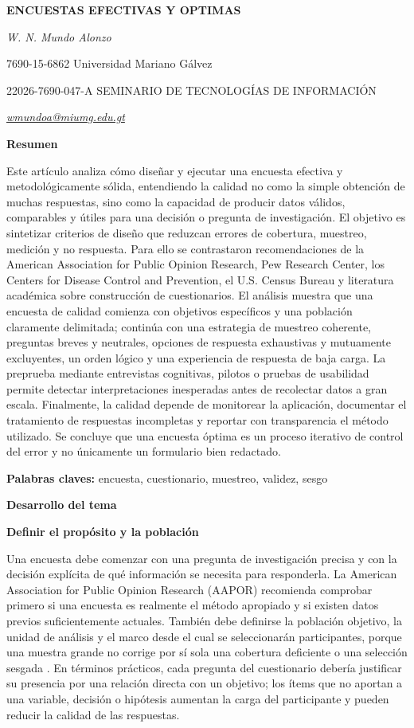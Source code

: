 \documentclass[12pt,letterpaper]{article}
\newcommand{\seccion}[1]{%
  \vspace{4pt}%
  {\noindent\textbf{#1}\par}%
  \vspace{1pt}%
}
\begin{document}
\justifying
\sloppy

\begin{center}
{\bfseries ENCUESTAS EFECTIVAS Y OPTIMAS\par}
\vspace{4pt}
{\itshape W. N. Mundo Alonzo\par}
7690-15-6862 Universidad Mariano Gálvez\par
22026-7690-047-A SEMINARIO DE TECNOLOGÍAS DE INFORMACIÓN\par
{\itshape \href{mailto:wmundoa@miumg.edu.gt}{wmundoa@miumg.edu.gt}\par}
\end{center}

\seccion{Resumen}
Este artículo analiza cómo diseñar y ejecutar una encuesta efectiva y metodológicamente sólida, entendiendo la calidad no como la simple obtención de muchas respuestas, sino como la capacidad de producir datos válidos, comparables y útiles para una decisión o pregunta de investigación. El objetivo es sintetizar criterios de diseño que reduzcan errores de cobertura, muestreo, medición y no respuesta. Para ello se contrastaron recomendaciones de la American Association for Public Opinion Research, Pew Research Center, los Centers for Disease Control and Prevention, el U.S. Census Bureau y literatura académica sobre construcción de cuestionarios. El análisis muestra que una encuesta de calidad comienza con objetivos específicos y una población claramente delimitada; continúa con una estrategia de muestreo coherente, preguntas breves y neutrales, opciones de respuesta exhaustivas y mutuamente excluyentes, un orden lógico y una experiencia de respuesta de baja carga. La preprueba mediante entrevistas cognitivas, pilotos o pruebas de usabilidad permite detectar interpretaciones inesperadas antes de recolectar datos a gran escala. Finalmente, la calidad depende de monitorear la aplicación, documentar el tratamiento de respuestas incompletas y reportar con transparencia el método utilizado. Se concluye que una encuesta óptima es un proceso iterativo de control del error y no únicamente un formulario bien redactado.

\noindent\textbf{Palabras claves:} encuesta, cuestionario, muestreo, validez, sesgo

\seccion{Desarrollo del tema}

\textbf{Definir el propósito y la población}\par
Una encuesta debe comenzar con una pregunta de investigación precisa y con la decisión explícita de qué información se necesita para responderla. La American Association for Public Opinion Research (AAPOR) recomienda comprobar primero si una encuesta es realmente el método apropiado y si existen datos previos suficientemente actuales. También debe definirse la población objetivo, la unidad de análisis y el marco desde el cual se seleccionarán participantes, porque una muestra grande no corrige por sí sola una cobertura deficiente o una selección sesgada \parencite{aapor_best}. En términos prácticos, cada pregunta del cuestionario debería justificar su presencia por una relación directa con un objetivo; los ítems que no aportan a una variable, decisión o hipótesis aumentan la carga del participante y pueden reducir la calidad de las respuestas.
\end{document}
